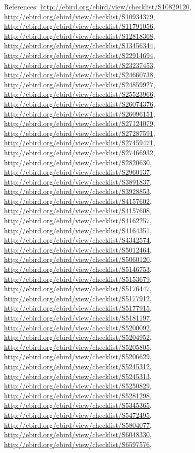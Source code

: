 \documentclass[9pt, article]{memoir}
\begin{document}
\begin{multicols}{2}
\vspace{6pt}References: 
\url{http://ebird.org/ebird/view/checklist/S10829120}, 
\url{http://ebird.org/ebird/view/checklist/S10934379}, 
\url{http://ebird.org/ebird/view/checklist/S11791056}, 
\url{http://ebird.org/ebird/view/checklist/S12818368}, 
\url{http://ebird.org/ebird/view/checklist/S13456344}, 
\url{http://ebird.org/ebird/view/checklist/S22914694}, 
\url{http://ebird.org/ebird/view/checklist/S23237453}, 
\url{http://ebird.org/ebird/view/checklist/S24660738}, 
\url{http://ebird.org/ebird/view/checklist/S24859927}, 
\url{http://ebird.org/ebird/view/checklist/S25523966}, 
\url{http://ebird.org/ebird/view/checklist/S26074376}, 
\url{http://ebird.org/ebird/view/checklist/S26096151}, 
\url{http://ebird.org/ebird/view/checklist/S27124079}, 
\url{http://ebird.org/ebird/view/checklist/S27287591}, 
\url{http://ebird.org/ebird/view/checklist/S27459471}, 
\url{http://ebird.org/ebird/view/checklist/S27466932}, 
\url{http://ebird.org/ebird/view/checklist/S2820630}, 
\url{http://ebird.org/ebird/view/checklist/S2960137}, 
\url{http://ebird.org/ebird/view/checklist/S3891837}, 
\url{http://ebird.org/ebird/view/checklist/S3928853}, 
\url{http://ebird.org/ebird/view/checklist/S4157602}, 
\url{http://ebird.org/ebird/view/checklist/S4157608}, 
\url{http://ebird.org/ebird/view/checklist/S4162257}, 
\url{http://ebird.org/ebird/view/checklist/S4164351}, 
\url{http://ebird.org/ebird/view/checklist/S4342574}, 
\url{http://ebird.org/ebird/view/checklist/S5012464}, 
\url{http://ebird.org/ebird/view/checklist/S5060120}, 
\url{http://ebird.org/ebird/view/checklist/S5146753}, 
\url{http://ebird.org/ebird/view/checklist/S5153679}, 
\url{http://ebird.org/ebird/view/checklist/S5176447}, 
\url{http://ebird.org/ebird/view/checklist/S5177912}, 
\url{http://ebird.org/ebird/view/checklist/S5177915}, 
\url{http://ebird.org/ebird/view/checklist/S5181197}, 
\url{http://ebird.org/ebird/view/checklist/S5200092}, 
\url{http://ebird.org/ebird/view/checklist/S5204952}, 
\url{http://ebird.org/ebird/view/checklist/S5205805}, 
\url{http://ebird.org/ebird/view/checklist/S5206629}, 
\url{http://ebird.org/ebird/view/checklist/S5245312}, 
\url{http://ebird.org/ebird/view/checklist/S5245313}, 
\url{http://ebird.org/ebird/view/checklist/S5250829}, 
\url{http://ebird.org/ebird/view/checklist/S5281298}, 
\url{http://ebird.org/ebird/view/checklist/S5345365}, 
\url{http://ebird.org/ebird/view/checklist/S5472495}, 
\url{http://ebird.org/ebird/view/checklist/S5804077}, 
\url{http://ebird.org/ebird/view/checklist/S6048330}, 
\url{http://ebird.org/ebird/view/checklist/S6597576}, 

\end{multicols}
\end{document}
